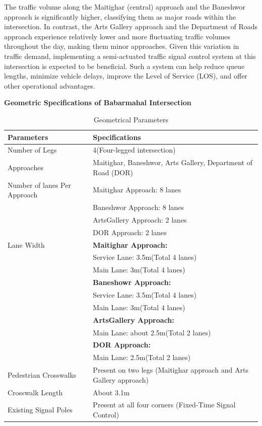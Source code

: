 The traffic volume along the Maitighar (central) approach and the 
Baneshwor approach is significantly higher, classifying them as 
major roads within the intersection. In contrast, the Arts Gallery
approach and the Department of Roads approach experience relatively 
lower and more fluctuating traffic volumes throughout the day, making 
them minor approaches. Given this variation in traffic demand, implementing 
a semi-actuated traffic signal control system at this intersection is 
expected to be beneficial. Such a system can help reduce queue lengths, 
minimize vehicle delays, improve the Level of Service (LOS), and 
offer other operational advantages.

\textbf{Geometric Specifications of Babarmahal Intersection}

\begin{table}[h]
    \centering
    \caption{Geometrical Parameters}
    \renewcommand{\arraystretch}{1.5}
    \begin{tabular}{|l|V{8cm}|}
        \hline
        \textbf{Parameters} & \textbf{Specifications} \\
        \hline
        Number of Legs & 4(Four-legged intersection)\\
        \hline
        Approaches & Maitighar, Baneshwor, Arts Gallery, Department of Road (DOR)\\
        \hline
        Number of lanes Per Approach & Maitighar Approach: 8 lanes \\ 
        & Baneshwor Approach: 8 lanes \\ 
        & ArtsGallery Approach: 2 lanes \\ 
        & DOR  Approach: 2 lanes \\
        \hline
        Lane Width & \textbf{Maitighar Approach:} \\ 
        & Service Lane: 3.5m(Total 4 lanes) \\ 
        & Main Lane: 3m(Total 4 lanes) \\
        & \textbf{Baneshowr Approach:} \\
        & Service Lane: 3.5m(Total 4 lanes) \\ 
        & Main Lane: 3m(Total 4 lanes) \\
        & \textbf{ArtsGallery Approach:} \\
        & Main Lane: about 2.5m(Total 2 lanes) \\
        & \textbf{DOR Approach:} \\
        & Main Lane: 2.5m(Total 2 lanes) \\
        \hline
        Pedestrian Crosswalks & Present on two legs (Maitighar approach and Arts Gallery approach) \\
        \hline
        Crosswalk Length & About 3.1m \\
        \hline
        Existing Signal Poles & Present at all four corners (Fixed-Time Signal Control) \\
        \hline
    \end{tabular}
    
\end{table}

